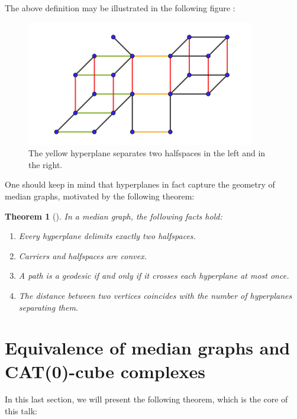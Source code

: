 \documentclass[12pt, a4paper]{article}
\theoremstyle{plain}
\newtheorem{theorem}{Theorem}[section]
\theoremstyle{definition}
\theoremstyle{remark}
\begin{document}
    The above definition may be illustrated in the following figure \cite{genevois}:
    
    \begin{figure}[H]
        \centering
        \includegraphics[width=0.6\linewidth]{hyperplane}
        \caption{The yellow hyperplane separates two halfspaces in the left and in the right.}
    \end{figure}
    
     One should keep in mind that hyperplanes in fact capture the geometry of median graphs, motivated by the following theorem:
    
    \begin{theorem}[\cite{genevois}]
        In a median graph, the following facts hold:
        
        \begin{enumerate}
            \item Every hyperplane delimits exactly two halfspaces.
            \item Carriers and halfspaces are convex.
            \item A path is a geodesic if and only if it crosses each hyperplane at most once.
            \item The distance between two vertices coincides with the number of hyperplanes separating them.
        \end{enumerate}
    \end{theorem}
    
    \section{Equivalence of median graphs and CAT(0)-cube complexes}
    
    In this last section, we will present the following theorem, which is the core of this talk:
    
\end{document}
